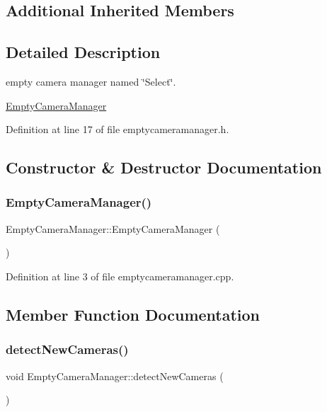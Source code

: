 \subsection*{Additional Inherited Members}


\subsection{Detailed Description}
empty camera manager named \char`\"{}\+Select\char`\"{}. 

\mbox{\hyperlink{class_empty_camera_manager}{Empty\+Camera\+Manager}} 

Definition at line 17 of file emptycameramanager.\+h.



\subsection{Constructor \& Destructor Documentation}
\mbox{\label{class_empty_camera_manager_a59d2ea5daf2dafe8d985bb168a1f7a58}} 
\subsubsection{\texorpdfstring{EmptyCameraManager()}{EmptyCameraManager()}}
{\footnotesize\ttfamily Empty\+Camera\+Manager\+::\+Empty\+Camera\+Manager (\begin{DoxyParamCaption}{ }\end{DoxyParamCaption})}



Definition at line 3 of file emptycameramanager.\+cpp.



\subsection{Member Function Documentation}
\mbox{\label{class_empty_camera_manager_ae32a44d1576763cf49d46dba3aef0007}} 
\subsubsection{\texorpdfstring{detectNewCameras()}{detectNewCameras()}}
{\footnotesize\ttfamily void Empty\+Camera\+Manager\+::detect\+New\+Cameras (\begin{DoxyParamCaption}\item[{std\+::vector$<$ \mbox{\hyperlink{class_abstract_camera}{Abstract\+Camera}} $\ast$ $>$ $\ast$}]{ }\end{DoxyParamCaption})\hspace{0.3cm}{\ttfamily [virtual]}}



